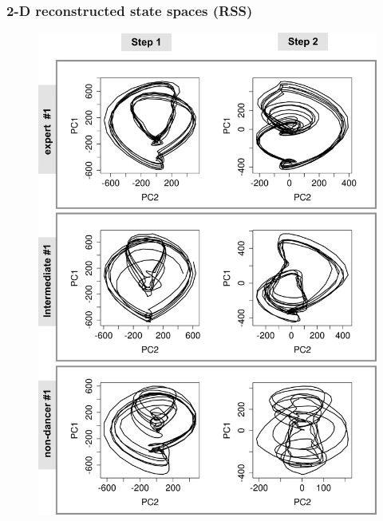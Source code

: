 \documentclass{beamer}
\begin{document}
\begin{frame}
\frametitle{2-D reconstructed state spaces (RSS)}
\vspace{-0.6cm}
\begin{figure}
\includegraphics[scale=0.09]{skills} \\

\end{figure}  
\end{frame}
\end{document}
